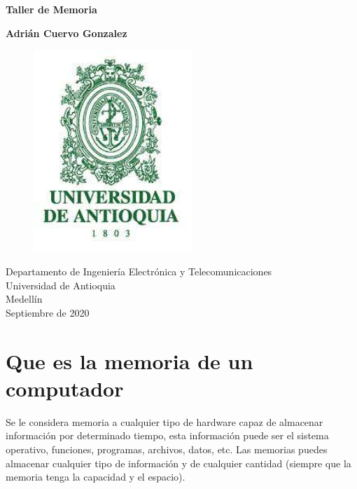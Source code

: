 \documentclass{article}
\begin{document}
	
	\begin{titlepage}
		\begin{center}
			\vspace*{1cm}
			
			\Huge
			\textbf{Taller de Memoria}
			
			\vspace{0.5cm}
			\LARGE
			
			\vspace{1.5cm}
			
			\textbf{Adrián Cuervo Gonzalez}
			\vfill
			\begin{figure}[h]
				\includegraphics[width=6cm]{Images/EscudoUdeA.jpg}
				\centering
				\label{fig:EscudoUdeA}
			\end{figure}
			
			\vspace{0.8cm}
			
			\Large
			Departamento de Ingeniería Electrónica y Telecomunicaciones\\
			Universidad de Antioquia\\
			Medellín\\
			Septiembre de 2020
			
		\end{center}
	\end{titlepage}
	
	\tableofcontents
	\newpage
	\section{Que es la memoria de un computador}\label{intro}
	Se le considera memoria a cualquier tipo de hardware capaz de almacenar información por determinado tiempo, esta información puede ser el sistema operativo, funciones, programas, archivos, datos, etc. Las memorias puedes almacenar cualquier tipo de información y de cualquier cantidad (siempre que la memoria tenga la capacidad y el espacio).
	
\end{document}
